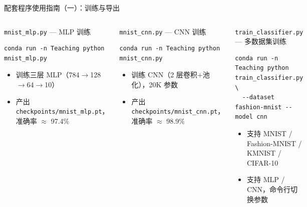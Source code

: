 \documentclass[aspectratio=169]{ctexbeamer}
\begin{document}
\begin{frame}[fragile,shrink=15]{配套程序使用指南（一）：训练与导出}
\footnotesize

\begin{columns}[T]
\begin{block}{\texttt{mnist\_mlp.py} — MLP 训练}
\begin{lstlisting}[basicstyle=\ttfamily\scriptsize, frame=none, numbers=none, backgroundcolor=\color{codebg}]
conda run -n Teaching python mnist_mlp.py
\end{lstlisting}
\vspace{-0.35cm}
\begin{itemize}
  \item 训练三层 MLP（784$\to$128$\to$64$\to$10）
  \item 产出 \texttt{checkpoints/mnist\_mlp.pt}，准确率 $\approx$ 97.4\%
\end{itemize}
\end{block}

\vspace{0.05cm}

\begin{block}{\texttt{mnist\_cnn.py} — CNN 训练}
\begin{lstlisting}[basicstyle=\ttfamily\scriptsize, frame=none, numbers=none, backgroundcolor=\color{codebg}]
conda run -n Teaching python mnist_cnn.py
\end{lstlisting}
\vspace{-0.35cm}
\begin{itemize}
  \item 训练 CNN（2 层卷积+池化），20K 参数
  \item 产出 \texttt{checkpoints/mnist\_cnn.pt}，准确率 $\approx$ 98.9\%
\end{itemize}
\end{block}

\vspace{0.05cm}

\begin{block}{\texttt{train\_classifier.py} — 多数据集训练}
\begin{lstlisting}[basicstyle=\ttfamily\scriptsize, frame=none, numbers=none, backgroundcolor=\color{codebg}]
conda run -n Teaching python train_classifier.py \
  --dataset fashion-mnist --model cnn
\end{lstlisting}
\vspace{-0.35cm}
\begin{itemize}
  \item 支持 MNIST / Fashion-MNIST / KMNIST / CIFAR-10
  \item 支持 MLP / CNN，命令行切换参数
\end{itemize}
\end{block}


\end{columns}
\end{frame}
\end{document}
